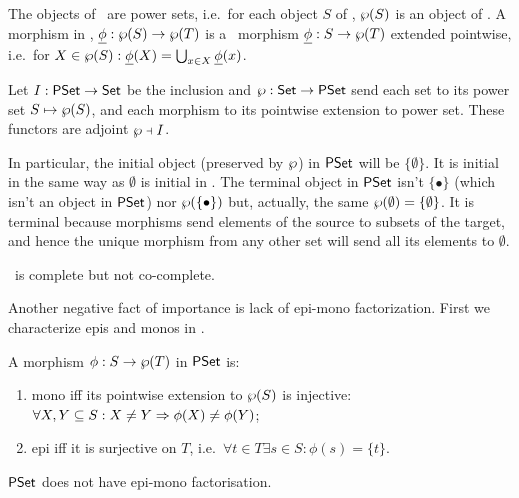 \documentclass[10pt]{article}
\begin{document}
\begin{Definition}
The objects of \PSt\ are power sets, i.e.\ for each object $S$ of
\Set, $\wp(S)$ is an object of \PSt.  A morphism in \PSt,
$\underline {\phi}:\wp(S)\rightarrow \wp(T)$ is a \Set\ morphism
$\underline {\phi}:S\rightarrow\wp(T)$ extended pointwise, i.e.\ for
$X\in\wp(S) : \underline {\phi}(X) = \bigcup_{x\in X}\underline {\phi}(x)$.
\end{Definition}

\begin{Prop}
\label{le:adjSPS}
Let $I:\mbox{\rm\sf PSet}\rightarrow\mbox{\rm\sf Set}$ be the inclusion and $\wp:\mbox{\rm\sf Set}\rightarrow\mbox{\rm\sf PSet}$ send
each set to its power set $S\mapsto\wp(S)$, and each morphism to its
pointwise extension to power set. These functors are adjoint
$\wp\mathrel{\scriptstyle\dashv} I$.
\end{Prop}

\noindent
In particular, the initial object (preserved by $\wp$) in $\mbox{\rm\sf PSet}$
will be $\{\emptyset\}$.  It is initial in the same way as $\emptyset$
is initial in \Set.  The terminal object in $\mbox{\rm\sf PSet}$ isn't $\{\bullet\}$
(which isn't an object in $\mbox{\rm\sf PSet}$) nor $\wp(\{\bullet\})$ but,
actually, the same $\wp(\emptyset)=\{\emptyset\}$. It is terminal because
morphisms send elements of the source to subsets of the target, and
hence the unique morphism from any other set will send all its
elements to $\emptyset$.

\begin{Prop}
\label{le:PStcompl}\label{le:PSnocoeq}
\PSt\ is complete but not co-complete.
\end{Prop}

\noindent
Another negative fact of importance is lack of epi-mono factorization. 
First we characterize epis and monos in \PSt.

\begin{Lemma}
\label{le:charepimono}
A morphism $\phi:S\rightarrow \wp(T)$ in $\mbox{\rm\sf PSet}$ is:
\begin{enumerate}\MyLPar
\item 
mono iff its pointwise extension to $\wp(S)$ is injective:
$\forall X,Y\subseteq S: X\not=Y \Rightarrow \phi(X)\not=\phi(Y)$;
\item 
epi iff it is surjective on $T$, i.e.\ $\forall t\in T \exists s\in S:
\phi(s)=\{t\}$.
\end{enumerate}
\end{Lemma}

\begin{Lemma}
\label{le:noepi-mono}
$\mbox{\rm\sf PSet}$ does not have epi-mono factorisation.
\end{Lemma}
\end{document}
